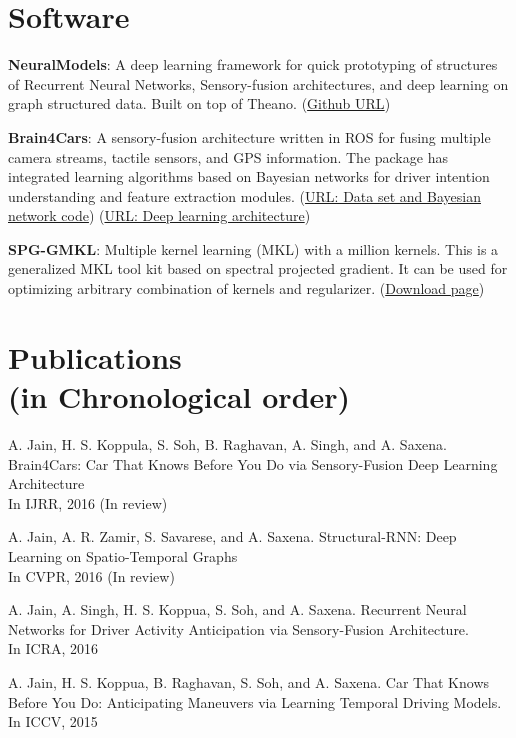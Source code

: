 \documentclass[line,margin]{res}
\begin{document}
\begin{resume}
 \section{Software}
 
 \textbf{NeuralModels}: A deep learning framework for quick prototyping of structures of Recurrent Neural Networks, Sensory-fusion architectures, and deep learning on graph structured data. Built on top of Theano.   (\href{https://github.com/asheshjain399/NeuralModels}{Github URL})
 
 \textbf{Brain4Cars}: A sensory-fusion architecture written in ROS for fusing
 multiple camera streams, tactile sensors, and GPS information. The package has
 integrated learning algorithms based on Bayesian networks for driver intention
 understanding and feature extraction modules.
 (\href{https://github.com/asheshjain399/ICCV2015_Brain4Cars}{URL: Data set and
 Bayesian network code}) (\href{https://github.com/asheshjain399/RNNexp}{URL: Deep
 learning architecture})

\textbf{SPG-GMKL}: Multiple kernel learning (MKL) with a million kernels. This is a generalized MKL tool kit based on spectral projected gradient. It can be used for optimizing arbitrary combination of kernels and regularizer. (\href{http://www.cs.cornell.edu/~ashesh/pubs/code/SPG-GMKL/download.html}{Download page})  
 \section{Publications\\ (in Chronological order)} 

  		A. Jain, H. S. Koppula, S. Soh, B. Raghavan, A. Singh, and A. Saxena.
Brain4Cars: Car That Knows Before You Do via Sensory-Fusion Deep Learning Architecture\\In IJRR, 2016 (In review) 

 		A. Jain, A. R. Zamir, S. Savarese, and A. Saxena.
Structural-RNN: Deep Learning on Spatio-Temporal Graphs\\In CVPR, 2016 (In review) 

		A. Jain, A. Singh, H. S. Koppua, S. Soh, and A. Saxena.
Recurrent Neural Networks for Driver Activity Anticipation via Sensory-Fusion Architecture.\\ In ICRA, 2016
 
		A. Jain, H. S. Koppua, B. Raghavan, S. Soh, and A. Saxena.
Car That Knows Before You Do: Anticipating Maneuvers via Learning Temporal Driving Models.\\In ICCV, 2015 



\end{resume}
\end{document}
